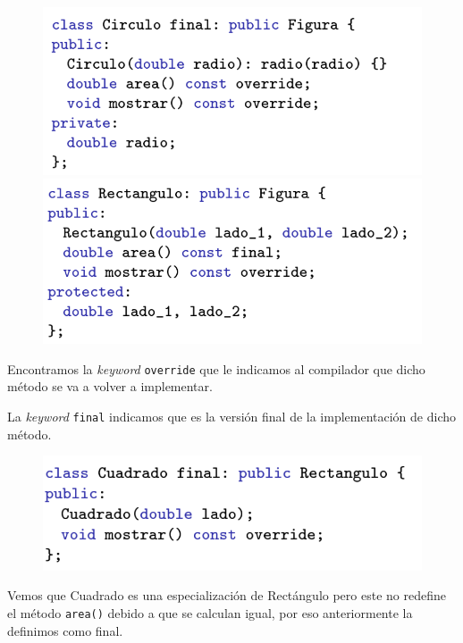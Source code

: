 \begin{figure}[h]
	\begin{minipage}{0.5\textwidth}
		\includegraphics[width=\textwidth]{Imagenes/poli6.png}
	\end{minipage}
	\hfill
	\begin{minipage}{0.5\textwidth}
		\includegraphics[width=\textwidth]{Imagenes/poli7.png}
	\end{minipage}
\end{figure}

Encontramos la \textit{keyword} \texttt{override} que le indicamos al compilador que dicho método se va a volver a implementar.

La \textit{keyword} \texttt{final} indicamos que es la versión final de la implementación de dicho método.
\newpage

\begin{figure}[h]
	\begin{center}
		\includegraphics[width=\textwidth]{Imagenes/poli8.png}
	\end{center}
\end{figure}

Vemos que Cuadrado es una especialización de Rectángulo pero este no redefine el método \texttt{area()} debido a que se calculan igual, por eso anteriormente la definimos como final.












